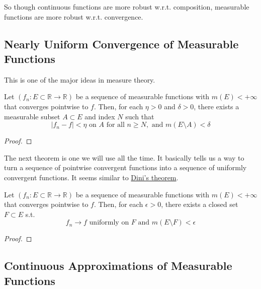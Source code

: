   So though continuous functions are more robust w.r.t. composition, measurable functions are more robust w.r.t. convergence. 

\subsection{Nearly Uniform Convergence of Measurable Functions} 

  This is one of the major ideas in measure theory. 

  \begin{lemma} 
    Let $(f_n: E \subset \mathbb{R} \to \mathbb{R})$ be a sequence of measurable functions with $m(E) < +\infty$ that converges pointwise to $f$. Then, for each $\eta > 0$ and $\delta > 0$, there exists a measurable subset $A \subset E$ and index $N$ such that 
    \begin{equation}
      |f_n - f| < \eta \text{ on } A \text{ for all } n \geq N, \text{ and } m(E \setminus A) < \delta 
    \end{equation}
  \end{lemma}
  \begin{proof}
    
  \end{proof}

  The next theorem is one we will use all the time. It basically tells us a way to turn a sequence of pointwise convergent functions into a sequence of uniformly convergent functions. It seems similar to \hyperref[real-thm:dini]{Dini's theorem}. 

  \begin{theorem}[Egorov]
    Let $(f_n: E \subset \mathbb{R} \to \mathbb{R})$ be a sequence of measurable functions with $m(E) < +\infty$ that converges pointwise to $f$. Then, for each $\epsilon > 0$, there exists a closed set $F \subset E$  s.t. 
    \begin{equation}
      f_n \to f \text{ uniformly on } F \text{ and } m(E \setminus F) < \epsilon
    \end{equation}
  \end{theorem}
  \begin{proof}
    
  \end{proof}

\subsection{Continuous Approximations of Measurable Functions}

